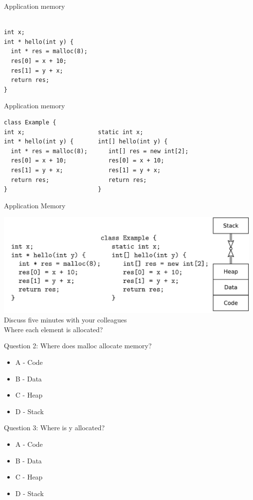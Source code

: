 \documentclass{beamer}
\begin{document}
\begin{frame}[fragile]{Application memory}
\begin{Verbatim}[fontsize=\small]

int x;
int * hello(int y) {
  int * res = malloc(8);
  res[0] = x + 10;
  res[1] = y + x;
  return res;
}
\end{Verbatim}
\end{frame}

\begin{frame}[fragile]{Application memory}
\begin{Verbatim}[fontsize=\small]
                        class Example {
int x;                     static int x;
int * hello(int y) {       int[] hello(int y) {
  int * res = malloc(8);      int[] res = new int[2];
  res[0] = x + 10;            res[0] = x + 10;
  res[1] = y + x;             res[1] = y + x;
  return res;                 return res;
}                          }
\end{Verbatim}
\end{frame}

\begin{frame}[t]{Application Memory}
\center
{
  \includegraphics[width=0.9\linewidth]{code1}
   {
    Discuss five minutes with your colleagues\\
  }
   {
    Where each element is allocated?
  }
   {
    Question 2: Where does malloc allocate memory?
    \begin{itemize}
      \item A - Code
      \item B - Data
      \item C - Heap
      \item D - Stack
    \end{itemize}
  }
   {
    Question 3: Where is y allocated?
    \begin{itemize}
      \item A - Code
      \item B - Data
      \item C - Heap
      \item D - Stack
    \end{itemize}
  }
}
\end{frame}
\end{document}
